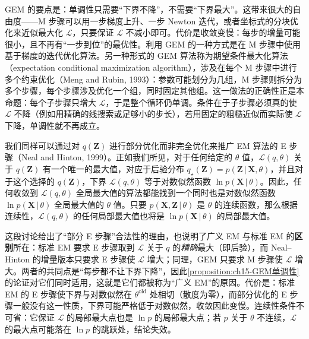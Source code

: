 \documentclass[../../main.tex]{subfiles}
\begin{document}
\begin{remark}
GEM 的要点是：单调性只需要“下界不降”，不需要“下界最大”。这带来很大的自由度——M 步骤可以用一步梯度上升、一步 Newton 迭代，或者坐标式的分块优化来近似最大化 $\mathcal{L}$，只要保证 $\mathcal{L}$ 不减小即可。代价是收敛变慢：每步的增量可能很小，且不再有“一步到位”的最优性。利用 GEM 的一种方式是在 M 步骤中使用基于梯度的迭代优化算法。另一种形式的 GEM 算法称为期望条件最大化算法（expectation conditional maximization algorithm），涉及在每个 M 步骤中进行多个约束优化（Meng and Rubin, 1993）：参数可能划分为几组，M 步骤则拆分为多个步骤，每个步骤涉及优化一个组，同时固定其他组。这一做法的正确性正是本命题：每个子步骤只增大 $\mathcal{L}$，于是整个循环仍单调。条件在于子步骤必须真的使 $\mathcal{L}$ 不降（例如用精确的线搜索或足够小的步长），若用固定的粗糙近似而实际使 $\mathcal{L}$ 下降，单调性就不再成立。
\end{remark}

我们同样可以通过对 $q(\bm{Z})$ 进行部分优化而非完全优化来推广 EM 算法的 E 步骤（Neal and Hinton, 1999）。正如我们所见，对于任何给定的 $\theta$ 值，$\mathcal{L}(q,\theta)$ 关于 $q(\bm{Z})$ 有一个唯一的最大值，对应于后验分布 $q_\star(\bm{Z})=p(\bm{Z}\,|\,\bm{X},\theta)$，并且对于这个选择的 $q(\bm{Z})$，下界 $\mathcal{L}(q,\theta)$ 等于对数似然函数 $\ln p(\bm{X}\,|\,\theta)$。因此，任何收敛到 $\mathcal{L}(q,\theta)$ 全局最大值的算法都能找到一个同时也是对数似然函数 $\ln p(\bm{X}\,|\,\theta)$ 全局最大值的 $\theta$ 值。只要 $p(\bm{X},\bm{Z}\,|\,\theta)$ 是 $\theta$ 的连续函数，那么根据连续性，$\mathcal{L}(q,\theta)$ 的任何局部最大值也将是 $\ln p(\bm{X}\,|\,\theta)$ 的局部最大值。

\begin{remark}
这段讨论给出了“部分 E 步骤”合法性的理由，也说明了广义 EM 与标准 EM 的\textbf{区别}所在：标准 EM 要求 E 步骤取到 $\mathcal{L}$ 关于 $q$ 的\emph{精确}最大（即后验），而 Neal--Hinton 的增量版本只要求 E 步骤使 $\mathcal{L}$ 增大；同理，GEM 只要求 M 步骤使 $\mathcal{L}$ 增大。两者的共同点是“每步都不让下界下降”，因此\cref{proposition:ch15-GEM单调性}的论证对它们同时适用，这就是它们都被称为“广义 EM”的原因。代价是：标准 EM 的 E 步骤使下界与对数似然在 $\theta^{\text{old}}$ 处相切（散度为零），而部分优化的 E 步骤一般没有这一性质，下界可能严格低于对数似然，收敛因此变慢。连续性条件不可省：它保证 $\mathcal{L}$ 的局部最大点也是 $\ln p$ 的局部最大点；若 $p$ 关于 $\theta$ 不连续，$\mathcal{L}$ 的最大点可能落在 $\ln p$ 的跳跃处，结论失效。
\end{remark}
\end{document}
